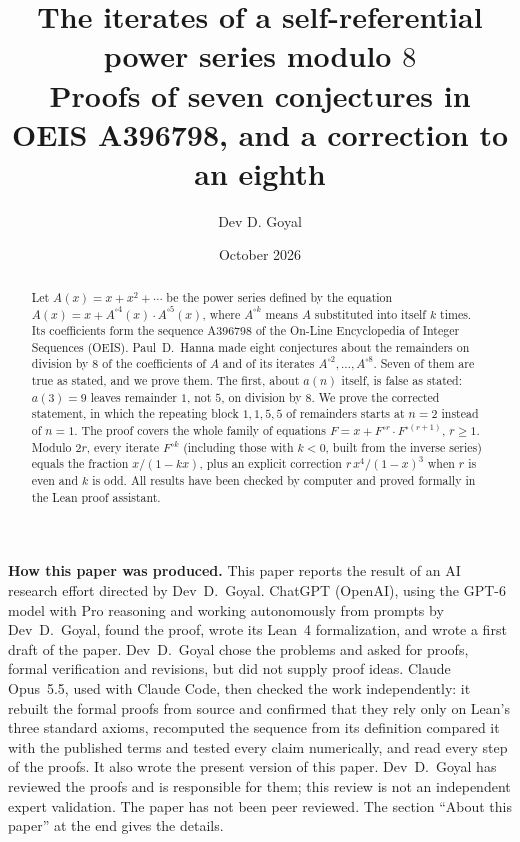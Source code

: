 \documentclass[11pt,a4paper]{article}
\title{The iterates of a self-referential power series modulo $8$\\[6pt]\large Proofs of seven conjectures in OEIS A396798, and a correction to an eighth}
\author{Dev D. Goyal}
\date{October 2026}
\theoremstyle{definition}
\theoremstyle{remark}
\begin{document}
\maketitle
\begin{abstract}
Let $A(x)=x+x^2+\cdots$ be the power series defined by the equation
$A(x)=x+A^{\circ4}(x)\cdot A^{\circ5}(x)$, where $A^{\circ k}$ means $A$ substituted into
itself $k$ times. Its coefficients form the sequence A396798 of the On-Line Encyclopedia of Integer Sequences
(OEIS). Paul~D.~Hanna made eight conjectures about the remainders on division by $8$ of the coefficients of $A$ and of its
iterates $A^{\circ2},\dots,A^{\circ8}$. Seven of them are true as stated, and we prove them. The first, about $a(n)$ itself, is false as
stated: $a(3)=9$ leaves remainder $1$, not $5$, on division by $8$. We prove the corrected statement, in which the
repeating block $1,1,5,5$ of remainders starts at $n=2$ instead of $n=1$. The proof covers the whole family of
equations $F=x+F^{\circ r}\cdot F^{\circ(r+1)}$, $r\ge1$. Modulo $2r$, every iterate $F^{\circ k}$ (including those
with $k<0$, built from the inverse series) equals the fraction $x/(1-kx)$, plus an explicit correction
$r\,x^4/(1-x)^3$ when $r$ is even and $k$ is odd. All results have been checked by computer and proved formally in the
Lean proof assistant.
\end{abstract}
\begin{center}\begin{minipage}{0.88\linewidth}\small
\textbf{How this paper was produced.} This paper reports the result of an AI research effort directed by
Dev~D.~Goyal. ChatGPT (OpenAI), using the GPT-6 model with Pro reasoning and working autonomously from prompts by
Dev~D.~Goyal, found the proof, wrote its Lean~4 formalization, and wrote a first draft of the paper.
Dev~D.~Goyal chose the problems and asked for proofs, formal verification and revisions, but did not supply proof
ideas. Claude Opus~5.5, used with Claude Code, then checked the work independently: it rebuilt the formal proofs from
source and confirmed that they rely only on Lean's three standard axioms, recomputed the sequence from its definition
compared it with the published terms and tested every claim numerically, and read every step of the proofs. It also wrote the present
version of this paper.
Dev~D.~Goyal has reviewed the proofs and is responsible for them; this review is not an independent expert validation.
The paper has not been peer reviewed.
The section ``About this paper'' at the end gives the details.
\end{minipage}\end{center}
\end{document}
